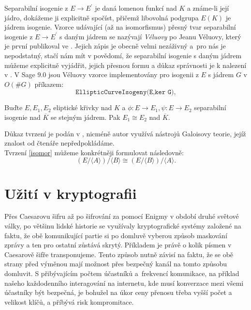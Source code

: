 \documentclass [12pt]{report}
\begin{document}
Separabilní isogenie z $E \longrightarrow E^\prime$ je daná lomenou funkcí nad $K$ a známe-li její jádro, dokážeme ji explicitně spočíst, přičemž libovolná podgrupa $E(K)$ je jádrem isogenie. Vzorce udávající (až na isomorfismus) přesný tvar separabilní isogenie z $E \longrightarrow E^\prime$ s daným jádrem se nazývají \textit{Véluovy} po Jeanu Véluovy, který je první publikoval ve \cite{Velu}. Jejich zápis je obecně velmi nezáživný a~pro nás je nepodstatný, stačí nám mít v povědomí, že separabilní isogenie s daným jádrem můžeme explicitně vyjádřit, jejich přesnou formu a důkaz správnosti je k nalezení v \cite[Ch.~8.2]{DeFeo}. V Sage $9.0$ jsou Véluovy vzorce implementovány pro isogenii z $E$ s jádrem $G$ v $O(\# G)$ příkazem:
\begin{equation*}
\texttt{EllipticCurveIsogeny(E,ker G)},
\end{equation*}

 
\begin{veta}\label{isomor}
Buďte $E,E_1,E_2$ eliptické křivky nad $K$ a  $\phi : E \longrightarrow E_1,\psi: E \longrightarrow E_2$ separabilní isogenie nad $\overline{K}$ se stejným jádrem. Pak  $E_1 \cong  E_2$ nad $\overline{K}$.
\end{veta}

Důkaz tvrzení je podán v \cite[Prop. 12.12]{Washington}, nicméně autor využívá nástrojů Galoisovy teorie, jejíž znalost od čtenáře nepředpokládáme.\\

Tvrzení \eqref{isomor} můžeme konkrétněji formulovat následovně:
\begin{equation*}
(E/ \langle A \rangle)/ \langle B \rangle \cong (E/ \langle B \rangle)/ \langle A \rangle.
\end{equation*}
 





\chapter{Užití v kryptografii}

Přes Caesarovu šifru až po šifrování za pomocí Enigmy v období druhé světové války, po většinu lidské historie se využívaly kryptografické systémy založené na faktu, že obě komunikující partie si po domluvě vyberou způsob maskování zprávy a ten pro ostatní zůstává skrytý. Příkladem je právě o kolik písmen v Caesarově šifře transponujeme. Tento způsob nutně závisí na faktu, že se obě strany před výměnou mají možnost přes bezpečný kanál na tomto způsobu domluvit. S přibývajícím počtem účastníků a~frekvencí komunikace, na příklad našeho každodenního interagování na internetu, kde musí konverzace mezi všemi účastníky být bezpečná, je bohužel na úkor ceny přenosu třeba vyšší počet a velikost klíčů, a příbývá risk kompromitace.\\
\end{document}
